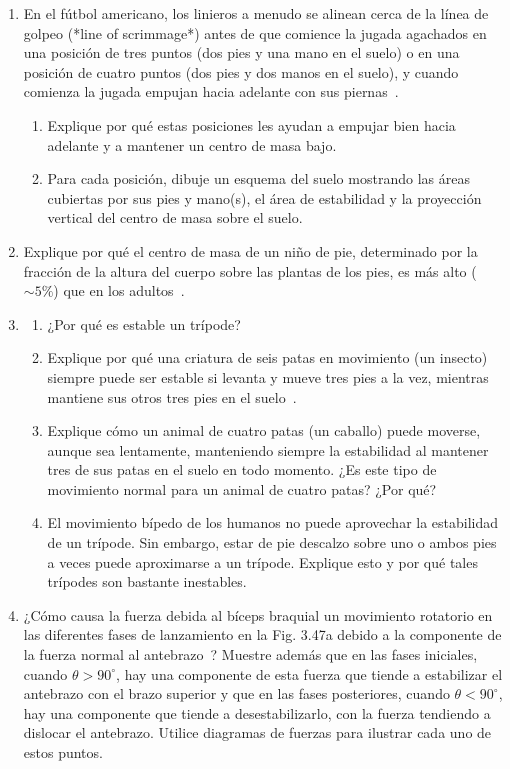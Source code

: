 \documentclass[12pt]{book}
\begin{document}
\begin{enumerate}
\item[3.6] En el fútbol americano, los linieros a menudo se alinean cerca de la línea de golpeo (*line of scrimmage*) antes de que comience la jugada agachados en una posición de tres puntos (dos pies y una mano en el suelo) o en una posición de cuatro puntos (dos pies y dos manos en el suelo), y cuando comienza la jugada empujan hacia adelante con sus piernas~\cite{ref60}.
\begin{enumerate}
\item[(a)] Explique por qué estas posiciones les ayudan a empujar bien hacia adelante y a mantener un centro de masa bajo.
\item[(b)] Para cada posición, dibuje un esquema del suelo mostrando las áreas cubiertas por sus pies y mano(s), el área de estabilidad y la proyección vertical del centro de masa sobre el suelo.
\end{enumerate}

\item[3.7] Explique por qué el centro de masa de un niño de pie, determinado por la fracción de la altura del cuerpo sobre las plantas de los pies, es más alto ($\sim 5\%$) que en los adultos~\cite{ref16}.

\item[3.8] 
\begin{enumerate}
\item[(a)] ¿Por qué es estable un trípode?
\item[(b)] Explique por qué una criatura de seis patas en movimiento (un insecto) siempre puede ser estable si levanta y mueve tres pies a la vez, mientras mantiene sus otros tres pies en el suelo~\cite{ref117}.
\item[(c)] Explique cómo un animal de cuatro patas (un caballo) puede moverse, aunque sea lentamente, manteniendo siempre la estabilidad al mantener tres de sus patas en el suelo en todo momento. ¿Es este tipo de movimiento normal para un animal de cuatro patas? ¿Por qué?
\item[(d)] El movimiento bípedo de los humanos no puede aprovechar la estabilidad de un trípode. Sin embargo, estar de pie descalzo sobre uno o ambos pies a veces puede aproximarse a un trípode. Explique esto y por qué tales trípodes son bastante inestables.
\end{enumerate}

\item[3.9] ¿Cómo causa la fuerza debida al bíceps braquial un movimiento rotatorio en las diferentes fases de lanzamiento en la Fig. 3.47a debido a la componente de la fuerza normal al antebrazo~\cite{ref48}? Muestre además que en las fases iniciales, cuando $\theta > 90^\circ$, hay una componente de esta fuerza que tiende a estabilizar el antebrazo con el brazo superior y que en las fases posteriores, cuando $\theta < 90^\circ$, hay una componente que tiende a desestabilizarlo, con la fuerza tendiendo a dislocar el antebrazo. Utilice diagramas de fuerzas para ilustrar cada uno de estos puntos.


\end{enumerate}
\end{document}
